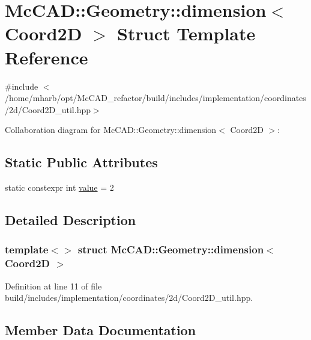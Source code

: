 \hypertarget{structMcCAD_1_1Geometry_1_1dimension_3_01Coord2D_01_4}{}\section{Mc\+C\+AD\+:\+:Geometry\+:\+:dimension$<$ Coord2D $>$ Struct Template Reference}
\label{structMcCAD_1_1Geometry_1_1dimension_3_01Coord2D_01_4}


{\ttfamily \#include $<$/home/mharb/opt/\+Mc\+C\+A\+D\+\_\+refactor/build/includes/implementation/coordinates/2d/\+Coord2\+D\+\_\+util.\+hpp$>$}



Collaboration diagram for Mc\+C\+AD\+:\+:Geometry\+:\+:dimension$<$ Coord2D $>$\+:
\subsection*{Static Public Attributes}
\begin{DoxyCompactItemize}
\item 
static constexpr int \hyperlink{structMcCAD_1_1Geometry_1_1dimension_3_01Coord2D_01_4_ae5fd044b66960fca68f67bc33971474b}{value} = 2
\end{DoxyCompactItemize}


\subsection{Detailed Description}
\subsubsection*{template$<$$>$\newline
struct Mc\+C\+A\+D\+::\+Geometry\+::dimension$<$ Coord2\+D $>$}



Definition at line 11 of file build/includes/implementation/coordinates/2d/\+Coord2\+D\+\_\+util.\+hpp.



\subsection{Member Data Documentation}
\mbox{\label{structMcCAD_1_1Geometry_1_1dimension_3_01Coord2D_01_4_ae5fd044b66960fca68f67bc33971474b}} 
